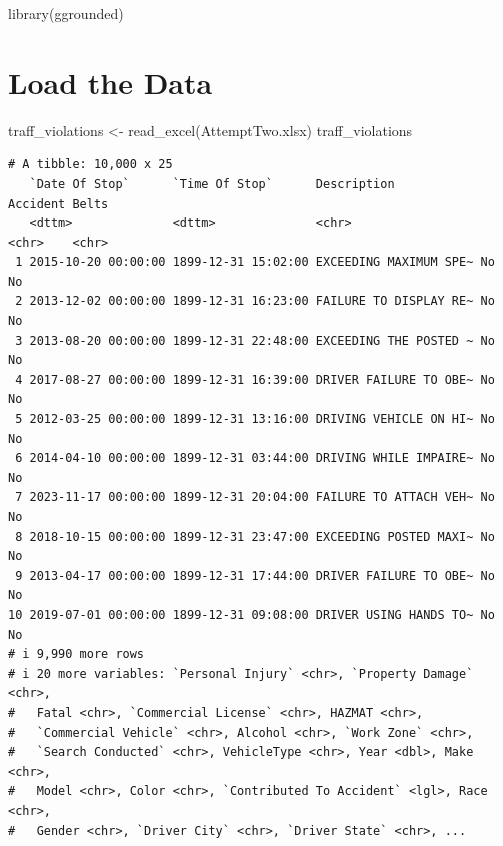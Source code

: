 \documentclass[
  letterpaper,
  DIV=11,
  numbers=noendperiod]{scrartcl}
\newenvironment{Shaded}{\begin{snugshade}}{\end{snugshade}}
\newcommand{\FunctionTok}[1]{\textcolor[rgb]{0.28,0.35,0.67}{#1}}
\newcommand{\NormalTok}[1]{\textcolor[rgb]{0.00,0.23,0.31}{#1}}
\newcommand{\OtherTok}[1]{\textcolor[rgb]{0.00,0.23,0.31}{#1}}
\newcommand{\StringTok}[1]{\textcolor[rgb]{0.13,0.47,0.30}{#1}}
\begin{document}
\begin{Shaded}
\begin{Highlighting}[]
\FunctionTok{library}\NormalTok{(ggrounded)}
\end{Highlighting}
\end{Shaded}

\section{Load the Data}\label{load-the-data}

\begin{Shaded}
\begin{Highlighting}[]
\NormalTok{traff\_violations }\OtherTok{\textless{}{-}} \FunctionTok{read\_excel}\NormalTok{(}\StringTok{\textquotesingle{}AttemptTwo.xlsx\textquotesingle{}}\NormalTok{)}
\NormalTok{traff\_violations}
\end{Highlighting}
\end{Shaded}

\begin{verbatim}
# A tibble: 10,000 x 25
   `Date Of Stop`      `Time Of Stop`      Description            Accident Belts
   <dttm>              <dttm>              <chr>                  <chr>    <chr>
 1 2015-10-20 00:00:00 1899-12-31 15:02:00 EXCEEDING MAXIMUM SPE~ No       No   
 2 2013-12-02 00:00:00 1899-12-31 16:23:00 FAILURE TO DISPLAY RE~ No       No   
 3 2013-08-20 00:00:00 1899-12-31 22:48:00 EXCEEDING THE POSTED ~ No       No   
 4 2017-08-27 00:00:00 1899-12-31 16:39:00 DRIVER FAILURE TO OBE~ No       No   
 5 2012-03-25 00:00:00 1899-12-31 13:16:00 DRIVING VEHICLE ON HI~ No       No   
 6 2014-04-10 00:00:00 1899-12-31 03:44:00 DRIVING WHILE IMPAIRE~ No       No   
 7 2023-11-17 00:00:00 1899-12-31 20:04:00 FAILURE TO ATTACH VEH~ No       No   
 8 2018-10-15 00:00:00 1899-12-31 23:47:00 EXCEEDING POSTED MAXI~ No       No   
 9 2013-04-17 00:00:00 1899-12-31 17:44:00 DRIVER FAILURE TO OBE~ No       No   
10 2019-07-01 00:00:00 1899-12-31 09:08:00 DRIVER USING HANDS TO~ No       No   
# i 9,990 more rows
# i 20 more variables: `Personal Injury` <chr>, `Property Damage` <chr>,
#   Fatal <chr>, `Commercial License` <chr>, HAZMAT <chr>,
#   `Commercial Vehicle` <chr>, Alcohol <chr>, `Work Zone` <chr>,
#   `Search Conducted` <chr>, VehicleType <chr>, Year <dbl>, Make <chr>,
#   Model <chr>, Color <chr>, `Contributed To Accident` <lgl>, Race <chr>,
#   Gender <chr>, `Driver City` <chr>, `Driver State` <chr>, ...
\end{verbatim}
\end{document}
